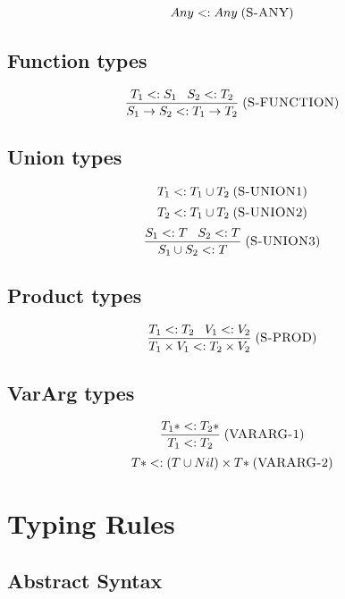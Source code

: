 \documentclass[12pt]{article}
\newcommand{\mylabel}[1]{\; (\textsc{#1})}
\newcommand{\subtype}{<:}
\begin{document}
\[
Any \subtype Any
\mylabel{S-ANY}
\]

\subsection{Function types}

\[
\frac{T_{1} \subtype S_{1} \;\;\; S_{2} \subtype T_{2}}
     {S_{1} \rightarrow S_{2} \subtype T_{1} \rightarrow T_{2}}
\mylabel{S-FUNCTION}
\]

\subsection{Union types}

\[
T_{1} \subtype T_{1} \cup T_{2}
\mylabel{S-UNION1}
\]
\[
T_{2} \subtype T_{1} \cup T_{2}
\mylabel{S-UNION2}
\]
\[
\frac{S_{1} \subtype T \;\;\; S_{2} \subtype T}
     {S_{1} \cup S_{2} \subtype T}
\mylabel{S-UNION3}
\]

\subsection{Product types}

\[
\frac{T_{1} \subtype T_{2} \;\;\; V_{1} \subtype V_{2}}
     {T_{1} \times V_{1} \subtype T_{2} \times V_{2}}
\mylabel{S-PROD}
\]

\subsection{VarArg types}

\[
\frac{T_{1}* \subtype T_{2}*}
     {T_{1} \subtype T_{2}}
\mylabel{VARARG-1}
\]
\[
{T*} \subtype (T \cup Nil) \times {T*}
\mylabel{VARARG-2}
\]

\section{Typing Rules}

\subsection{Abstract Syntax}
\end{document}
